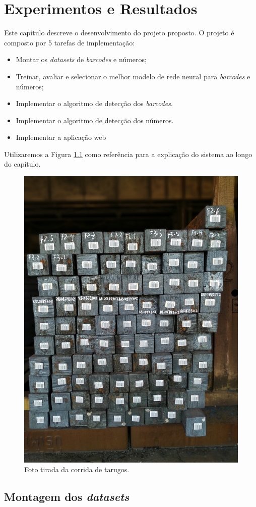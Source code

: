 
\chapter{Experimentos e Resultados}

Este capítulo descreve o desenvolvimento do projeto proposto. O projeto é composto por 5 tarefas de implementação:

\begin{itemize}
    \item Montar os \textit{datasets} de \textit{barcodes} e números;
    \item Treinar, avaliar e selecionar o melhor modelo de rede neural para \textit{barcodes} e números;
    \item Implementar o algoritmo de detecção dos \textit{barcodes}.
    \item Implementar o algoritmo de detecção dos números.
    \item Implementar a aplicação web
\end{itemize}

Utilizaremos a Figura \ref{fig:imagemBase} como referência para a explicação do sistema ao longo do capítulo.

\begin{figure}[h!]
	\centering
	\includegraphics[width=0.5\linewidth]{figuras/img1.jpg}
	\caption{Foto tirada da corrida de tarugos.}
	\label{fig:imagemBase}
\end{figure}

\section{Montagem dos \textit{datasets}}

